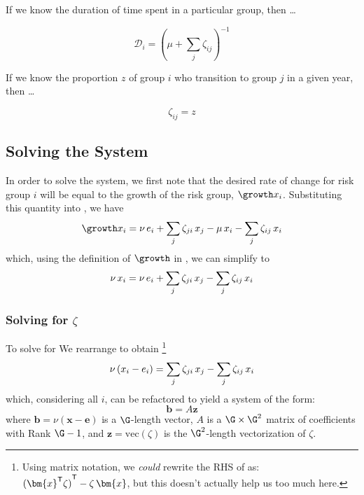 If we know the duration of time spent in a particular group, then \dots

\begin{equation}\label{eq:duration-group}
  \mathcal{D}_i = {\left(\mu + \sum_{j}{\zeta_{ij}}\right)}^{-1}
\end{equation}

If we know the proportion $z$ of group $i$ who transition to group $j$ in a given year, then \dots

\begin{equation}
\zeta_{ij} = z
\end{equation}

\subsection{Solving the System}\label{ss:solve}
In order to solve the system, we first note that the desired rate of change for risk group $i$
will be equal to the growth of the risk group, $\growth x_i$.
Substituting this quantity into , we have
\begin{equation}
  \growth x_i = \nu \thinspace e_i + \sum_{j}{\zeta_{ji} \thinspace x_j}
              - \mu \thinspace x_i - \sum_{j}{\zeta_{ij} \thinspace x_i}
\end{equation}
which, using the definition of $\growth$ in , we can simplify to
\begin{equation}
  \nu \thinspace x_i
      = \nu \thinspace e_i + \sum_{j}{\zeta_{ji} \thinspace x_j}
                           - \sum_{j}{\zeta_{ij} \thinspace x_i}
  \label{eq:system}
\end{equation}
\subsubsection{Solving for $\zeta$}\label{sss:solve-zeta}
To solve for We rearrange  to obtain
\footnote{
  Using matrix notation, we \textit{could} rewrite the RHS of  as:
  ${({\bm{x}}^{\mathsf{T}}\zeta)}^{\mathsf{T}} - \zeta \thinspace \bm{x}$,
  but this doesn't actually help us too much here.}
\begin{equation}\label{eq:system-zeta}
\nu \left( x_i - e_i \right)
= \sum_{j}{\zeta_{ji} \thinspace x_j}
- \sum_{j}{\zeta_{ij} \thinspace x_i}
\end{equation}
which, considering all $i$, can be refactored to yield a system of the form:
\begin{equation}
\bm{b} = A \bm{z}
\end{equation}
where
$\bm{b} = \nu (\bm{x} - \bm{e})$ is a $\G$-length vector,
$A$ is a ${\G}\times\G^2$ matrix of coefficients with Rank $\G-1$, and
$\bm{z} = \mathrm{vec}(\zeta)$ is the $\G^2$-length vectorization of $\zeta$.
